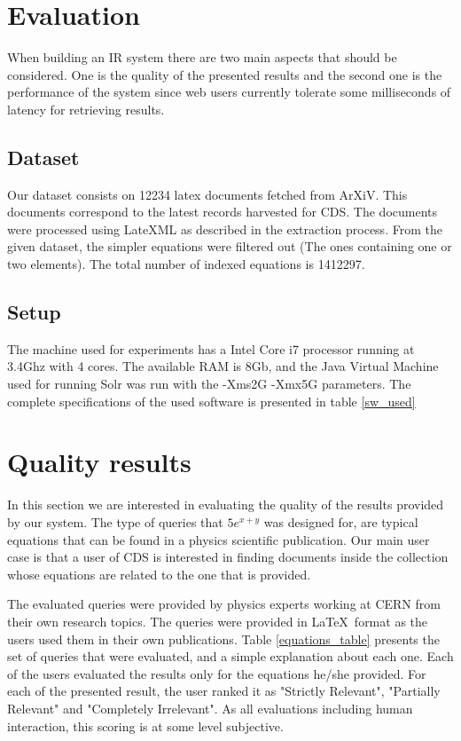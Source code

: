 \section{Evaluation}
When building an IR system there are two main aspects that should be considered. One is the quality of the presented results and the second one is the performance of the system since web users currently tolerate some milliseconds of latency for retrieving results. 

\subsection{Dataset}
Our dataset consists on 12234 latex documents fetched from ArXiV. This documents correspond to the latest records harvested for CDS. The documents were processed using LateXML as described in the extraction process. From the given dataset, the simpler equations were filtered out (The ones containing one or two elements). The total number of indexed equations is 1412297.

\subsection{Setup}

The machine used for experiments has a Intel Core i7 processor running at 3.4Ghz with 4 cores. The available RAM is 8Gb, and the Java Virtual Machine used for running Solr was run with the {\codefont -Xms2G -Xmx5G} parameters. The complete specifications of the used software is presented in table \ref{sw_used}



\section{Quality results}
In this section we are interested in evaluating the quality of the results provided by our system.
The type of queries that $5e^{x+y}$ was designed for, are typical equations that can be found in a physics scientific publication. 
Our main user case is that a user of CDS is interested in finding documents inside the collection whose equations are related to the one that is provided.  

The evaluated queries were provided by physics experts working at CERN from their own research topics. The queries were provided in \LaTeX\ format as the users used them in their own publications.
Table \ref{equations_table} presents the set of queries that were evaluated, and a simple explanation about each one. 
Each of the users evaluated the results only for the equations he/she provided. For each of the presented result, the user ranked it as "Strictly Relevant", "Partially Relevant" and "Completely Irrelevant". As all evaluations including human interaction, this scoring is at some level subjective. 

